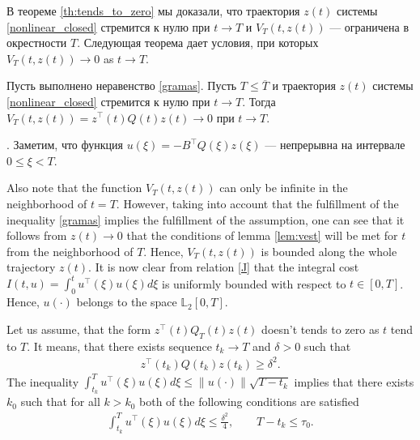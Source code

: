 \documentclass[../main.tex]{subfiles}
\begin{document}
В теореме  \ref{th:tends_to_zero} мы доказали, что траектория $z(t)$  системы \eqref{nonlinear_closed} стремится к нулю при $t\to T$ и $V_{T}(t,z(t))$ --- ограничена в окрестности $T$. 
Следующая теорема дает условия, при которых $V_{T}(t,z(t))\to 0$ as $t\to T$.
\begin{theorem}
    Пусть выполнено неравенство \eqref{gramas}. Пусть $T \leqslant \overline{T}$ и траектория  $z(t)$ системы \eqref{nonlinear_closed} стремится к нулю при $t\to T$. Тогда  $V_{T}(t,z(t))  =z^{\top}(t)Q(t)z(t) \to 0$  при $t \to T$.
\end{theorem}
\doc. 
    Заметим, что функция $ u(\xi) = -B^{\top} Q(\xi) z(\xi)$ --- непрерывна на интервале $0 \leqslant \xi <T$. 

    Also note that the function $V_{T}(t,z(t))$ can only be infinite in the neighborhood of $t = T$. 
    However, taking into account that the fulfillment of the inequality \eqref{gramas} implies the fulfillment of the assumption, one can see that it follows from  $z(t) \to 0 $ that the conditions of lemma \ref{lem:vest} will be met for $t$ from the neighborhood of $T$.
    Hence, $V_{T}(t,z(t))$ is bounded along the whole trajectory $z(t)$. It is now clear from relation \eqref{J} that the integral cost $I(t,u) = \int_{0}^{t} u^{\top}(\xi)u(\xi) d\xi$  is uniformly bounded with respect to $t\in [0,T]$. Hence, $u(\cdot)$ belongs to the space $\mathbb L_2[0,T]$. 
    
   Let us assume, that the form $z^{\top}(t)Q_T(t)z(t) $ doesn't tends to zero as $t$ tend to $T$.
    It means, that there exists sequence $ t_k \to T$ and $\delta > 0$ such that 
    \begin{gather}\label{zqz_geq_del2}
    z^{\top}(t_k)Q(t_k)z(t_k) \geqslant \delta^2.  
    \end{gather}
    The inequality $ \int_{t_k}^{T} u^{\top}(\xi)u(\xi) d\xi \leqslant 
\|u(\cdot)\|\sqrt{T - t_k}  $ implies that there exists $k_0$ such that for all $k > k_0$ both of the following conditions are satisfied 
\begin{gather*}
    \int_{t_k}^{T} u^{\top}(\xi)u(\xi) d\xi \leqslant \frac{\delta^2}{4}, \qquad T-t_k \leqslant \tau_0.
\end{gather*}
\end{document}
